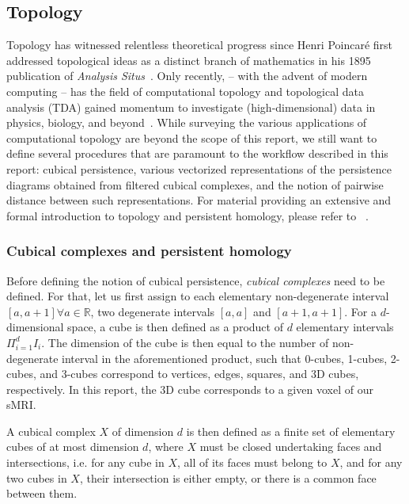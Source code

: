 \documentclass{article}
\begin{document}
\subsection{Topology}

Topology has witnessed relentless theoretical progress since Henri Poincaré first addressed
topological ideas as a distinct branch of mathematics in his 1895 publication of \textit{Analysis
  Situs}~\citep{poincare1895analysis, james1999history}. Only recently, -- with the advent of
modern computing -- has the field of computational topology and topological data analysis (TDA) gained
momentum to investigate (high-dimensional) data in physics, biology, and
beyond~\citep{dey1999computational, ghrist2008barcodes, amezquita2020shape}. While surveying the
various applications of computational topology are beyond the scope of this report, we still want to
define several procedures that are paramount to the workflow described in this report: cubical
persistence, various vectorized representations of the persistence diagrams obtained from filtered
cubical complexes, and the notion of pairwise distance between such representations. For material
providing an extensive and formal introduction to topology and persistent homology, please refer to
~\citep{freedman2009algebraic, edelsbrunner2010computational, ghrist2008barcodes}.


\subsubsection{Cubical complexes and persistent homology}

Before defining the notion of cubical persistence, \emph{cubical complexes} need to be defined.
For that, let us first assign to each elementary non-degenerate interval $[a,a+1]\forall
a\in\mathbb{R}$, two degenerate intervals $[a,a]$ and $[a+1,a+1]$. For a $d$-dimensional space, a
cube is then defined as a product of $d$ elementary intervals $\Pi_{i=1}^{d}I_i$. The dimension of
the cube is then equal to the number of non-degenerate interval in the aforementioned product, such
that 0-cubes, 1-cubes, 2-cubes, and 3-cubes correspond to vertices, edges, squares, and 3D cubes,
respectively. In this report, the 3D cube corresponds to a given voxel of our sMRI.

A cubical complex $X$ of dimension $d$ is then defined as a finite set of elementary cubes of at
most dimension $d$, where $X$ must be closed undertaking faces and intersections, i.e. for any cube
in $X$, all of its faces must belong to $X$, and for any two cubes in $X$, their intersection is
either empty, or there is a common face between them.
\end{document}
